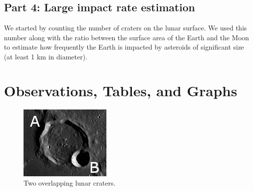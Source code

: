 \documentclass[11pt]{article}
\begin{document}
\subsection*{Part 4: Large impact rate estimation}
We started by counting the number of craters on the lunar surface.
We used this number along with the ratio between the surface area of the Earth and the Moon to estimate how frequently the Earth is impacted by asteroids of significant size (at least 1 km in diameter).


\section{Observations, Tables, and Graphs}
\begin{figure}[h]
\begin{center}
\includegraphics[width=0.75\columnwidth]{figures/overlapping_craters.jpg}
\end{center}
\caption{Two overlapping lunar craters.}
\label{img:overlapping-craters}
\end{figure}
\end{document}
